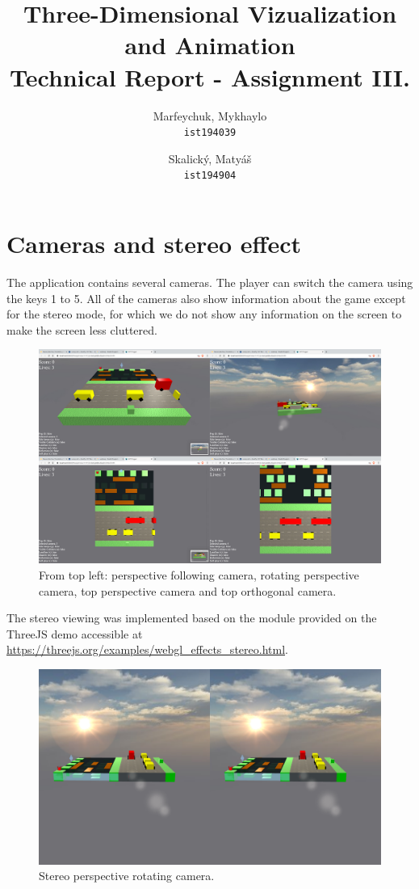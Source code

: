 \documentclass[a4paper,10pt]{article}
\title{Three-Dimensional Vizualization and Animation\\Technical Report - Assignment III.}
\author{
  Marfeychuk, Mykhaylo\\
  \texttt{ist194039}
  \and
  Skalický, Matyáš\\
  \texttt{ist194904}
}
\date{} %
\begin{document}
\maketitle


\section{Cameras and stereo effect}
The application contains several cameras. The player can switch the camera using the keys 1 to 5. All of the cameras also show information about the game except for the stereo mode, for which we do not show any information on the screen to make the screen less cluttered.

\begin{figure}[!htb]
	\centering
 	\includegraphics[width=\linewidth]{images/cam_merged.png}
  	\caption{From top left: perspective following camera, rotating perspective camera, top perspective camera and top orthogonal camera.}
	\label{cameras}
\end{figure}

The stereo viewing was implemented based on the module provided on the ThreeJS demo accessible at \url{https://threejs.org/examples/webgl_effects_stereo.html}. 

\begin{figure}[!htb]
	\centering
 	\includegraphics[width=\linewidth]{images/cam_stereo.png}
  	\caption{Stereo perspective rotating camera.}
	\label{stereocam}
\end{figure}
\end{document}
